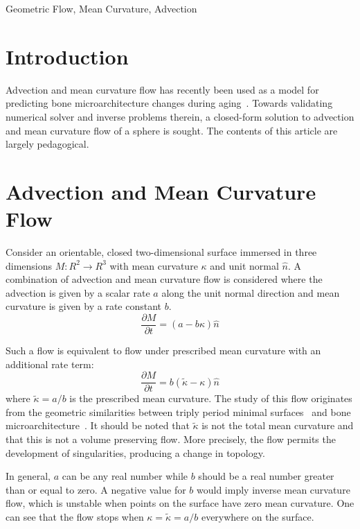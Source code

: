 \documentclass[journal]{IEEEtran}
\begin{document}
\begin{IEEEkeywords}
Geometric Flow, Mean Curvature, Advection
\end{IEEEkeywords}

\section{Introduction}
Advection and mean curvature flow has recently been used as a model for predicting bone microarchitecture changes during aging~\cite{besler2018bone}.
Towards validating numerical solver and inverse problems therein, a closed-form solution to advection and mean curvature flow of a sphere is sought.
The contents of this article are largely pedagogical.

\section{Advection and Mean Curvature Flow}
Consider an orientable, closed two-dimensional surface immersed in three dimensions $M \colon \!R^2 \rightarrow \!R^3$ with mean curvature $\kappa$ and unit normal $\hat{n}$.
A combination of advection and mean curvature flow is considered where the advection is given by a scalar rate $a$ along the unit normal direction and mean curvature is given by a rate constant $b$.
\begin{equation}
  \label{eqn:advection-mean}
  \frac{\partial M}{\partial t} = (a - b \kappa) \hat{n}
\end{equation}

Such a flow is equivalent to flow under prescribed mean curvature with an additional rate term:
\begin{equation}
  \frac{\partial M}{\partial t} = b(\tilde{\kappa} - \kappa) \hat{n}
\end{equation}
where $\tilde{\kappa} = a/b$ is the prescribed mean curvature.
The study of this flow originates from the geometric similarities between triply period minimal surfaces~\cite{schoen1970infinite,anderson1987periodic,chopp1993flow} and bone microarchitecture~\cite{hildebrand1999direct}.
It should be noted that $\tilde{\kappa}$ is not the total mean curvature and that this is not a volume preserving flow.
More precisely, the flow permits the development of singularities, producing a change in topology.

In general, $a$ can be any real number while $b$ should be a real number greater than or equal to zero.
A negative value for $b$ would imply inverse mean curvature flow, which is unstable when points on the surface have zero mean curvature.
One can see that the flow stops when $\kappa = \tilde{\kappa} = a/b$ everywhere on the surface.
\end{document}
